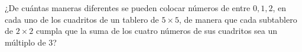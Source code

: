 ¿De cuántas maneras diferentes se pueden colocar números de entre $0, 1, 2$, en cada uno de los cuadritos de un tablero de $5 \times  5$, de manera que cada subtablero de $2 \times  2$ cumpla que la suma de los cuatro números de sus cuadritos sea un múltiplo de $3$?